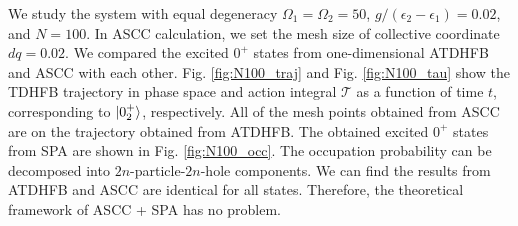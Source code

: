 \documentclass[%
superscriptaddress,
showpacs,
nofootinbib,
amsmath,amssymb,
aps,
prc,
twocolumn,
floatfix ]%
{revtex4-1}
\begin{document}
We study the system with equal degeneracy $\Omega_1=\Omega_2=50$, $g/(\epsilon_2-\epsilon_1)=0.02$, and $N=100$. In ASCC calculation, we set the mesh size of collective coordinate $dq=0.02$. We compared the excited $0^+$ states from one-dimensional ATDHFB and ASCC with each other. Fig. \ref{fig:N100_traj} and Fig. \ref{fig:N100_tau} show the TDHFB trajectory in phase space and  action integral $\mathcal{T}$ as a function of time $t$, corresponding to $\ket{0_2^+}$, respectively. All of the mesh points obtained from ASCC are on the trajectory obtained from ATDHFB. The obtained excited $0^+$ states from SPA are shown in Fig. \ref{fig:N100_occ}. The occupation probability can be decomposed into $2n$-particle-$2n$-hole components. We can find the results from ATDHFB and ASCC are identical for all states. Therefore, the theoretical framework of ASCC + SPA has no problem.
\end{document}
